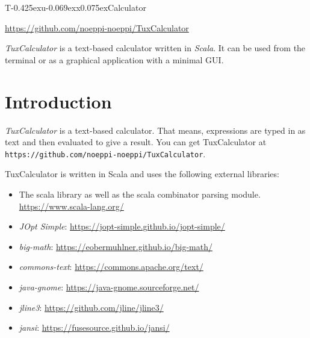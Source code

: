 \documentclass[10pt]{article}
\begin{document}
    \begin{center}
        {\Huge\fontsize{37pt}{37pt}\selectfont T\kern-0.425exu\kern-0.069exx\kern0.075exCalculator}
        
        \vspace*{24pt}
        \url{https://github.com/noeppi-noeppi/TuxCalculator}
    \end{center}
    \vspace*{48pt}
    
    \textit{TuxCalculator} is a text-based calculator written in \textsl{Scala}.
    It can be used from the terminal or as a graphical application with a minimal GUI\@.
    \vspace*{12pt}
    
    \tableofcontents
    \clearpage
    
    \section{Introduction}\label{sec:introduction}
    \textit{TuxCalculator} is a text-based calculator.
    That means, expressions are typed in as text and then evaluated to give a result.
    You can get TuxCalculator at \verb|https://github.com/noeppi-noeppi/TuxCalculator|.
    
    TuxCalculator is written in Scala and uses the following external libraries:
    \begin{itemize}
        \item The scala library as well as the scala combinator parsing module.\\
              \url{https://www.scala-lang.org/}
        \item \textsl{JOpt Simple}: \url{https://jopt-simple.github.io/jopt-simple/}
        \item \textsl{big-math}: \url{https://eobermuhlner.github.io/big-math/}
        \item \textsl{commons-text}: \url{https://commons.apache.org/text/}
        \item \textsl{java-gnome}: \url{https://java-gnome.sourceforge.net/}
        \item \textsl{jline3}: \url{https://github.com/jline/jline3/}
        \item \textsl{jansi}: \url{https://fusesource.github.io/jansi/}
    \end{itemize}
    
\end{document}

